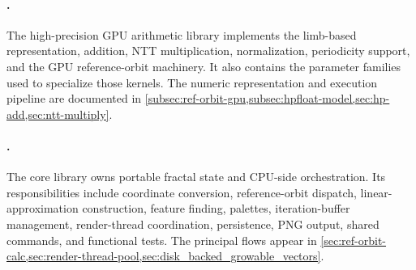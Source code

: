 \paragraph{.}
The high-precision GPU arithmetic library implements the limb-based
 representation, addition, NTT multiplication,
normalization, periodicity support, and the GPU reference-orbit machinery.  It
also contains the parameter families used to specialize those kernels.  The
numeric representation and execution pipeline are documented in
\cref{subsec:ref-orbit-gpu,subsec:hpfloat-model,sec:hp-add,sec:ntt-multiply}.

\paragraph{.}
The core library owns portable fractal state and CPU-side orchestration.  Its
responsibilities include coordinate conversion, reference-orbit dispatch,
linear-approximation construction, feature finding, palettes, iteration-buffer
management, render-thread coordination, persistence, PNG output, shared
commands, and functional tests.  The principal flows appear in
\cref{sec:ref-orbit-calc,sec:render-thread-pool,sec:disk_backed_growable_vectors}.


